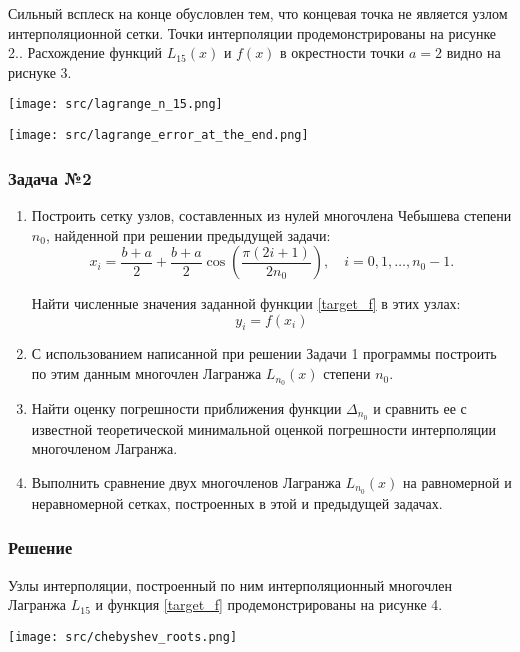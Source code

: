\documentclass[a4paper, fontsize=14pt]{article}
\begin{document}
    Сильный всплеск на конце обусловлен тем, что концевая точка не является узлом интерполяционной сетки. Точки интерполяции продемонстрированы на рисунке 2.. Расхождение функций $L_{15}(x)$ и $f(x)$ в окрестности точки $a = 2$ видно на риснуке 3.
    \begin{center}
        \texttt{[image: src/lagrange\_n\_15.png]}
    \end{center}

    \begin{center}
        \texttt{[image: src/lagrange\_error\_at\_the\_end.png]}
    \end{center}

    \subsubsection*{Задача №2}
    \begin{enumerate}
        \item Построить сетку узлов, составленных из нулей многочлена Чебышева степени $n_0$, найденной при решении предыдущей задачи:
        \begin{equation}
            \label{chebyshev_roots}
            x_i=\frac{b+a}{2} + \frac{b+a}{2}  \cos \left(\frac{\pi (2i+1)}{2 n_0 }\right),  \quad  i=0,1,\dots,n_{0}-1.
        \end{equation}
        
        Найти численные значения заданной функции \eqref{target_f} в этих узлах: $$y_i=f(x_i)$$
        \item  С использованием написанной при решении Задачи 1 программы построить по этим данным многочлен Лагранжа $L_{n_0}(x)$ степени $n_0$.
        \item  Найти оценку погрешности приближения функции $\Delta_{n_0}$ и сравнить ее с известной теоретической минимальной оценкой погрешности интерполяции многочленом Лагранжа.
        \item  Выполнить сравнение двух многочленов Лагранжа $L_{n_0}(x)$ на равномерной и неравномерной сетках, построенных в этой и предыдущей задачах.
    \end{enumerate}
    \subsubsection*{Решение}
    Узлы интерполяции, построенный по ним интерполяционный многочлен Лагранжа $L_{15}$ и функция \eqref{target_f} продемонстрированы на рисунке 4. 
    \begin{center}
        \texttt{[image: src/chebyshev\_roots.png]}
    \end{center}
    
\end{document}
